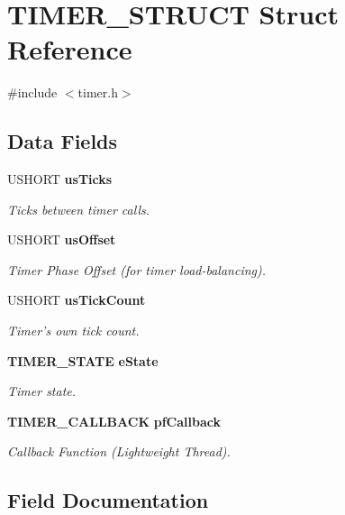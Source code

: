 \section{TIMER\_\-STRUCT Struct Reference}
\label{struct_t_i_m_e_r___s_t_r_u_c_t}


{\ttfamily \#include $<$timer.h$>$}\subsection*{Data Fields}
\begin{DoxyCompactItemize}
\item 
USHORT {\bf usTicks}
\begin{DoxyCompactList}\small\item\em Ticks between timer calls. \item\end{DoxyCompactList}\item 
USHORT {\bf usOffset}
\begin{DoxyCompactList}\small\item\em Timer Phase Offset (for timer load-\/balancing). \item\end{DoxyCompactList}\item 
USHORT {\bf usTickCount}
\begin{DoxyCompactList}\small\item\em Timer's own tick count. \item\end{DoxyCompactList}\item 
{\bf TIMER\_\-STATE} {\bf eState}
\begin{DoxyCompactList}\small\item\em Timer state. \item\end{DoxyCompactList}\item 
{\bf TIMER\_\-CALLBACK} {\bf pfCallback}
\begin{DoxyCompactList}\small\item\em Callback Function (Lightweight Thread). \item\end{DoxyCompactList}\end{DoxyCompactItemize}


\subsection{Field Documentation}
